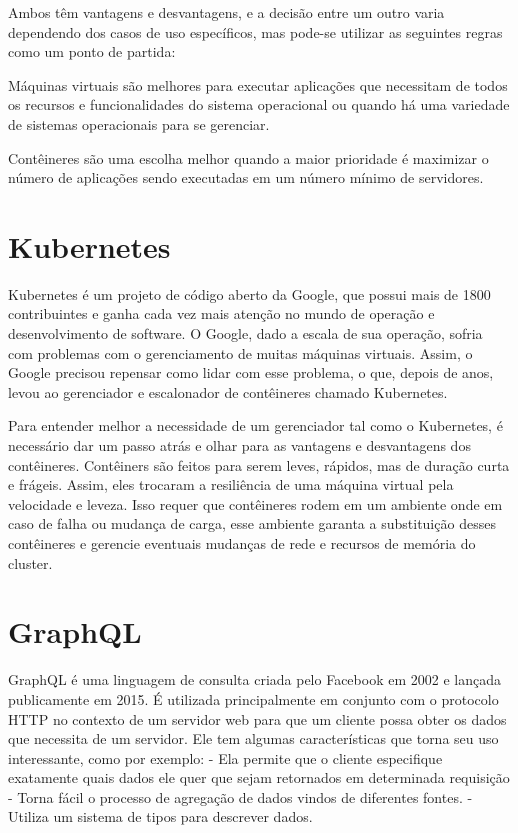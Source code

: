 	Ambos têm vantagens e desvantagens, e a decisão entre um outro varia dependendo dos casos de uso específicos, mas pode-se utilizar as seguintes regras como um ponto de partida:
	
	Máquinas virtuais são melhores para executar aplicações que necessitam de todos os recursos e funcionalidades do sistema operacional ou quando há uma variedade de sistemas operacionais para se gerenciar.
	
	Contêineres são uma escolha melhor quando a maior prioridade é maximizar o número de aplicações sendo executadas em um número mínimo de servidores.
	
	\section{Kubernetes}
	Kubernetes é um projeto de código aberto da Google, que possui mais de 1800 contribuintes e ganha cada vez mais atenção no mundo de operação e desenvolvimento de software. 
	O Google, dado a escala de sua operação, sofria com problemas com o gerenciamento de muitas máquinas virtuais. 
	Assim, o Google precisou repensar como lidar com esse problema, o que, depois de anos, levou ao gerenciador e escalonador de contêineres chamado Kubernetes.

	Para entender melhor a necessidade de um gerenciador tal como o Kubernetes, é necessário dar um passo atrás e olhar para as vantagens e desvantagens dos contêineres.
	Contêiners são feitos para serem leves, rápidos, mas de duração curta e frágeis.
	Assim, eles trocaram a resiliência de uma máquina virtual pela velocidade e leveza. Isso requer que contêineres rodem em um ambiente onde em caso de falha ou mudança de carga, esse ambiente garanta a substituição desses contêineres e gerencie eventuais mudanças de rede e recursos de memória do cluster.
	
    \section{GraphQL}
    GraphQL é uma linguagem de consulta criada pelo Facebook em 2002 e lançada publicamente em 2015. É utilizada principalmente em conjunto com o protocolo HTTP no contexto de um servidor web para que um cliente possa obter os dados que necessita de um servidor.
    Ele tem algumas características que torna seu uso interessante, como por exemplo:
    - Ela permite que o cliente especifique exatamente quais dados ele quer que sejam retornados em determinada requisição
    - Torna fácil o processo de agregação de dados vindos de diferentes fontes.
    - Utiliza um sistema de tipos para descrever dados.
    
